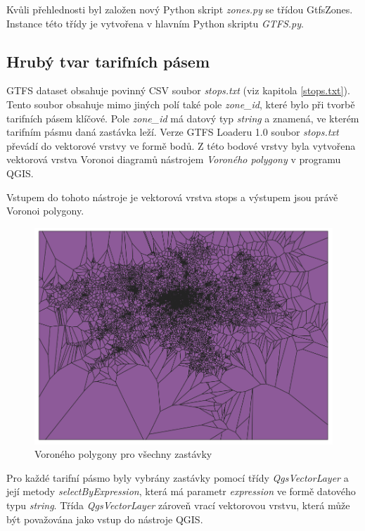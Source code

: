 Kvůli přehlednosti byl založen nový Python skript \textit{zones.py} se třídou GtfsZones. Instance této třídy je vytvořena
v hlavním Python skriptu \textit{GTFS.py}.

\subsection{Hrubý tvar tarifních pásem}

GTFS dataset obsahuje povinný CSV soubor \textit{stops.txt} (viz kapitola \ref{stops.txt}). Tento soubor obsahuje mimo
jiných polí také pole \textit{zone\_id}, které bylo při tvorbě tarifních pásem klíčové.
Pole \textit{zone\_id} má datový typ \textit{string} a znamená, ve kterém tarifním
pásmu daná zastávka leží. Verze GTFS Loaderu 1.0 soubor \textit{stops.txt} převádí do vektorové vrstvy
ve formě bodů. Z této bodové vrstvy byla vytvořena vektorová vrstva Voronoi 
diagramů nástrojem \textit{Voroného polygony} v programu QGIS. 

Vstupem do tohoto nástroje je vektorová vrstva stops a výstupem jsou právě Voronoi polygony.

\begin{figure}[H] \centering
    \includegraphics[width=400pt]{./pictures/voronoi-stops.png}
    \caption[Voroného polygony pro všechny zastávky]{Voroného polygony pro všechny zastávky}
	\label{fig:voronoi-stops}              
\end{figure}
  
Pro každé tarifní pásmo byly vybrány zastávky pomocí třídy \textit{QgsVectorLayer}
a její metody \textit{selectByExpression}, která má parametr \textit{expression} ve formě datového
typu \textit{string}. 
Třída \textit{QgsVectorLayer} zároveň vrací vektorovou vrstvu, která může být považována jako vstup do nástroje QGIS.


